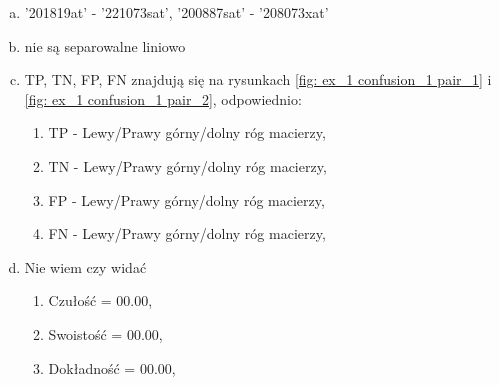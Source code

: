







    \begin{enumerate}[a)]
        \item '201819\textunderscore at' - '221073\textunderscore s\textunderscore at', '200887\textunderscore s\textunderscore at' - '208073\textunderscore x\textunderscore at'
        \item nie są separowalne liniowo
        \item TP, TN, FP, FN znajdują się na rysunkach \ref{fig: ex_1 confusion_1 pair_1} i \ref{fig: ex_1 confusion_1 pair_2}, odpowiednio:
            \begin{enumerate}[1.]
                \item TP - Lewy/Prawy górny/dolny róg macierzy,
                \item TN - Lewy/Prawy górny/dolny róg macierzy,
                \item FP - Lewy/Prawy górny/dolny róg macierzy,
                \item FN - Lewy/Prawy górny/dolny róg macierzy,
            \end{enumerate}
        \item Nie wiem czy widać
            \begin{enumerate}[1.]
                \item Czułość = $00.00$,
                \item Swoistość = $00.00$,
                \item Dokładność = $00.00$,
            \end{enumerate}
    \end{enumerate}

